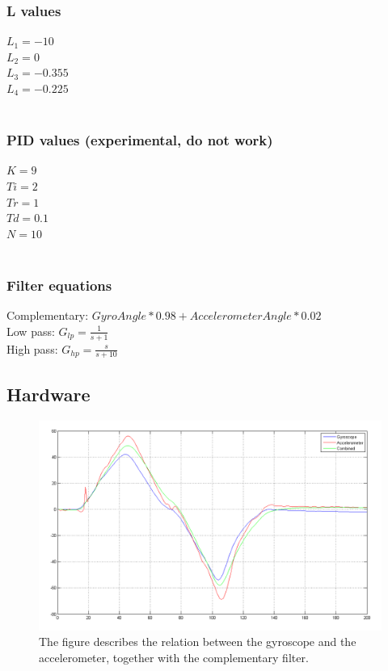 \documentclass[a4paper]{article}
\begin{document}
\subsubsection*{L values}
$L_1=-10$\\
$L_2=0$\\
$L_3=-0.355$\\
$L_4=-0.225$\\ \\

\subsubsection*{PID values (experimental, do not work)}
$K=9$\\
$Ti=2$\\
$Tr=1$\\
$Td=0.1$\\
$N=10$\\ \\

\subsubsection*{Filter equations}
Complementary: $GyroAngle * 0.98 + AccelerometerAngle*0.02$ \\
Low pass: $G_{lp} = \frac{1}{s+1}$\\
High pass: $G_{hp} = \frac{s}{s+10}$\\

\subsection{Hardware}

\begin{figure}[H]
 \centering
\includegraphics[scale=0.4]{pic/GyroAccCombAng.png}
\caption{The figure describes the relation between the gyroscope and the accelerometer, together with the complementary filter.}
\end{figure}
\end{document}
